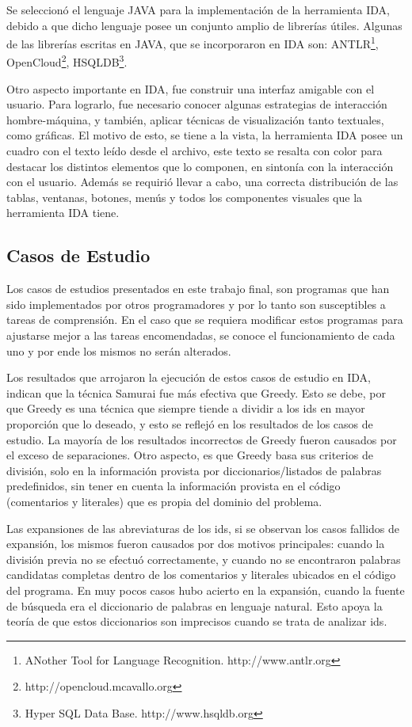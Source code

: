 Se seleccionó el lenguaje JAVA para la implementación de la herramienta IDA, debido a que dicho lenguaje posee un conjunto amplio de librerías útiles. Algunas de las librerías escritas en JAVA, que se incorporaron en IDA son: ANTLR\footnote[1]{ANother Tool for Language Recognition. http://www.antlr.org}, OpenCloud\footnote[2]{http://opencloud.mcavallo.org}, HSQLDB\footnote[3]{Hyper SQL Data Base. http://www.hsqldb.org}.

Otro aspecto importante en IDA, fue construir una interfaz amigable con el usuario. Para lograrlo, fue necesario conocer algunas estrategias de interacción hombre-máquina, y también, aplicar técnicas de visualización tanto textuales, como gráficas. El motivo de esto, se tiene a la vista, la herramienta IDA posee un cuadro con el texto leído desde el archivo, este texto se resalta con color para destacar los distintos elementos que lo componen, en sintonía con la interacción con el usuario. Además se requirió llevar a cabo, una correcta distribución de las tablas, ventanas, botones, menús y todos los componentes visuales que la herramienta IDA tiene.

\subsection{Casos de Estudio}

Los casos de estudios presentados en este trabajo final, son programas que han sido implementados por otros programadores y por lo tanto son susceptibles a tareas de comprensión. En el caso que se requiera modificar estos programas para ajustarse mejor a las tareas encomendadas, se conoce el funcionamiento de cada uno y por ende los mismos no serán alterados.

Los resultados que arrojaron la ejecución de estos casos de estudio en IDA, indican que la técnica Samurai fue más efectiva que Greedy. Esto se debe, por que Greedy es una técnica que siempre tiende a dividir a los ids en mayor proporción que lo deseado, y esto se reflejó en los resultados de los casos de estudio. La mayoría de los resultados incorrectos de Greedy fueron causados por el exceso de separaciones. Otro aspecto, es que Greedy basa sus criterios de división, solo en la información provista por diccionarios/listados de palabras predefinidos, sin tener en cuenta la información provista en el código (comentarios y literales) que es propia del dominio del problema.

Las expansiones de las abreviaturas de los ids, si se observan los casos fallidos de expansión, los mismos fueron causados por dos motivos principales: cuando la división previa no se efectuó correctamente, y cuando no se encontraron palabras candidatas completas dentro de los comentarios y literales ubicados en el código del programa. En muy pocos casos hubo acierto en la expansión, cuando la fuente de búsqueda era el diccionario de palabras en lenguaje natural. Esto apoya la teoría de que estos diccionarios son imprecisos cuando se trata de analizar ids.

